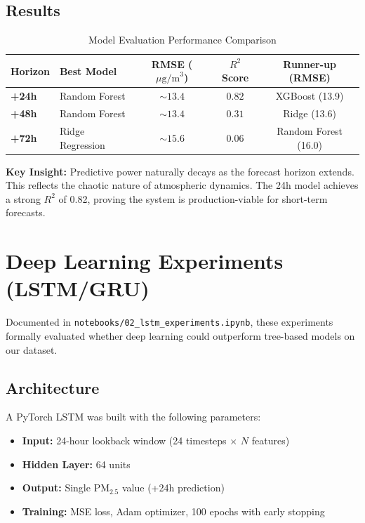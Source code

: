 \documentclass[11pt,a4paper]{article}
\begin{document}
\subsection{Results}

\begin{table}[h!]
\centering
\small
\begin{tabular}{llccc}
\toprule
\textbf{Horizon} & \textbf{Best Model} & \textbf{RMSE ($\mu\text{g/m}^3$)} & \textbf{$R^2$ Score} & \textbf{Runner-up (RMSE)} \\
\midrule
\textbf{+24h} & Random Forest & $\sim 13.4$ & $0.82$ & XGBoost (13.9) \\
\textbf{+48h} & Random Forest & $\sim 13.4$ & $0.31$ & Ridge (13.6) \\
\textbf{+72h} & Ridge Regression & $\sim 15.6$ & $0.06$ & Random Forest (16.0) \\
\bottomrule
\end{tabular}
\caption{Model Evaluation Performance Comparison}
\label{tab:model_results}
\end{table}

\textbf{Key Insight:} Predictive power naturally decays as the forecast horizon extends. This reflects the chaotic nature of atmospheric dynamics. The 24h model achieves a strong $R^2$ of 0.82, proving the system is production-viable for short-term forecasts.

\section{Deep Learning Experiments (LSTM/GRU)}

Documented in \texttt{notebooks/02\_lstm\_experiments.ipynb}, these experiments formally evaluated whether deep learning could outperform tree-based models on our dataset.

\subsection{Architecture}
A PyTorch LSTM was built with the following parameters:
\begin{itemize}
    \item \textbf{Input:} 24-hour lookback window (24 timesteps $\times$ $N$ features)
    \item \textbf{Hidden Layer:} 64 units
    \item \textbf{Output:} Single $\text{PM}_{2.5}$ value (+24h prediction)
    \item \textbf{Training:} MSE loss, Adam optimizer, 100 epochs with early stopping
\end{itemize}
\end{document}
